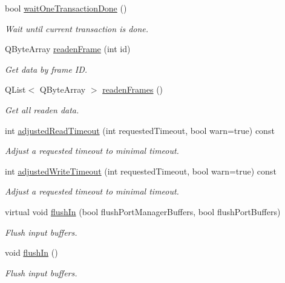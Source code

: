 \begin{DoxyCompactItemize}
bool \hyperlink{classmdt_port_manager_af60f089baded850018cbb90645c8e547}{waitOneTransactionDone} ()
\begin{DoxyCompactList}\small\item\em Wait until current transaction is done. \end{DoxyCompactList}\item 
QByteArray \hyperlink{classmdt_port_manager_a830ae182d06dd6a52c43a7f45b9240ac}{readenFrame} (int id)
\begin{DoxyCompactList}\small\item\em Get data by frame ID. \end{DoxyCompactList}\item 
QList$<$ QByteArray $>$ \hyperlink{classmdt_port_manager_addd5dcae9644cea42a9871205af41796}{readenFrames} ()
\begin{DoxyCompactList}\small\item\em Get all readen data. \end{DoxyCompactList}\item 
int \hyperlink{classmdt_port_manager_a7cb3155940e23db0122d14f21fca858d}{adjustedReadTimeout} (int requestedTimeout, bool warn=true) const 
\begin{DoxyCompactList}\small\item\em Adjust a requested timeout to minimal timeout. \end{DoxyCompactList}\item 
int \hyperlink{classmdt_port_manager_a9d6782be514745a1b1392216d17d41df}{adjustedWriteTimeout} (int requestedTimeout, bool warn=true) const 
\begin{DoxyCompactList}\small\item\em Adjust a requested timeout to minimal timeout. \end{DoxyCompactList}\item 
virtual void \hyperlink{classmdt_port_manager_ac0844a5cd4043a95a479d458ac7ce590}{flushIn} (bool flushPortManagerBuffers, bool flushPortBuffers)
\begin{DoxyCompactList}\small\item\em Flush input buffers. \end{DoxyCompactList}\item 
void \hyperlink{classmdt_port_manager_a4c44ce6ec40c4afc6be441c10d7ee827}{flushIn} ()
\begin{DoxyCompactList}\small\item\em Flush input buffers. \end{DoxyCompactList}\item 

\end{DoxyCompactItemize}
